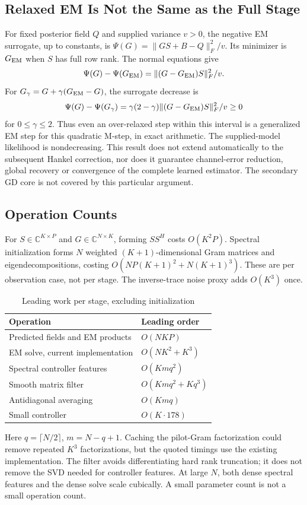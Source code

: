 \documentclass[journal]{IEEEtran}
\begin{document}
\subsection{Relaxed EM Is Not the Same as the Full Stage}
For fixed posterior field $Q$ and supplied variance $v>0$, the negative
EM surrogate, up to constants, is
$\Psi(G)=\|GS+B-Q\|_F^2/v$. Its minimizer is $G_{\rm EM}$ when $S$
has full row rank. The normal equations give
\begin{equation}
 \Psi(G)-\Psi(G_{\rm EM})=\|(G-G_{\rm EM})S\|_F^2/v.
\end{equation}
For $G_\gamma=G+\gamma(G_{\rm EM}-G)$, the surrogate decrease is
\begin{equation}
 \Psi(G)-\Psi(G_\gamma)=\gamma(2-\gamma)
 \|(G-G_{\rm EM})S\|_F^2/v\ge0
\end{equation}
for $0\le\gamma\le2$. Thus even an over-relaxed step within this
interval is a generalized EM step for this quadratic M-step, in exact
arithmetic. The supplied-model likelihood is nondecreasing. This result
does not extend automatically to the subsequent Hankel correction, nor
does it guarantee channel-error reduction, global recovery or convergence
of the complete learned estimator. The secondary GD core is not covered
by this particular argument.

\subsection{Operation Counts}
For $S\in\mathbb C^{K\times P}$ and $G\in\mathbb C^{N\times K}$,
forming $SS^H$ costs $O(K^2P)$. Spectral initialization forms $N$
weighted $(K+1)$-dimensional Gram matrices and eigendecompositions,
costing $O(NP(K+1)^2+N(K+1)^3)$. These are per observation case,
not per stage. The inverse-trace noise proxy adds $O(K^3)$ once.

\begin{table}[!t]
\caption{Leading work per stage, excluding initialization}
\centering\small
\begin{tabular}{@{}p{}p{}@{}}\toprule
Operation & Leading order\\\midrule
Predicted fields and EM products & $O(NKP)$\\
EM solve, current implementation & $O(NK^2+K^3)$\\
Spectral controller features & $O(Kmq^2)$\\
Smooth matrix filter & $O(Kmq^2+Kq^3)$\\
Antidiagonal averaging & $O(Kmq)$\\
Small controller & $O(K\cdot178)$\\\bottomrule
\end{tabular}
\end{table}
Here $q=\lceil N/2\rceil$, $m=N-q+1$. Caching the pilot-Gram
factorization could remove repeated $K^3$ factorizations, but the quoted
timings use the existing implementation. The filter avoids differentiating
hard rank truncation; it does not remove the SVD needed for controller
features. At large $N$, both dense spectral features and the dense solve
scale cubically. A small parameter count is not a small operation count.
\end{document}
